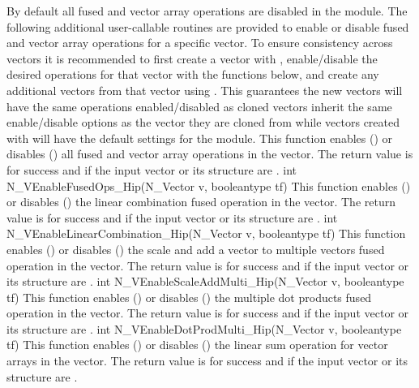 By default all fused and vector array operations are disabled in the {\nvechip}
module. The following additional user-callable routines are provided to
enable or disable fused and vector array operations for a specific vector. To
ensure consistency across vectors it is recommended to first create a vector
with , enable/disable the desired operations for that vector
with the functions below, and create any additional vectors from that vector
using . This guarantees the new vectors will have the same
operations enabled/disabled as cloned vectors inherit the same enable/disable
options as the vector they are cloned from while vectors created with
 will have the default settings for the {\nvechip} module.
{
  This function enables () or disables () all fused and
  vector array operations in the {\hip} vector. The return value is  for
  success and  if the input vector or its  structure are .
}
{
  int N\_VEnableFusedOps\_Hip(N\_Vector v, booleantype tf)
}
{
  This function enables () or disables () the linear
  combination fused operation in the {\hip} vector. The return value is  for
  success and  if the input vector or its  structure are .
}
{
  int N\_VEnableLinearCombination\_Hip(N\_Vector v, booleantype tf)
}
{
  This function enables () or disables () the scale and
  add a vector to multiple vectors fused operation in the {\hip} vector. The
  return value is  for success and  if the input vector or its
   structure are .
}
{
  int N\_VEnableScaleAddMulti\_Hip(N\_Vector v, booleantype tf)
}
{
  This function enables () or disables () the multiple
  dot products fused operation in the {\hip} vector. The return value is 
  for success and  if the input vector or its  structure are
  .
}
{
  int N\_VEnableDotProdMulti\_Hip(N\_Vector v, booleantype tf)
}
{
  This function enables () or disables () the linear sum
  operation for vector arrays in the {\hip} vector. The return value is  for
  success and  if the input vector or its  structure are .
}
